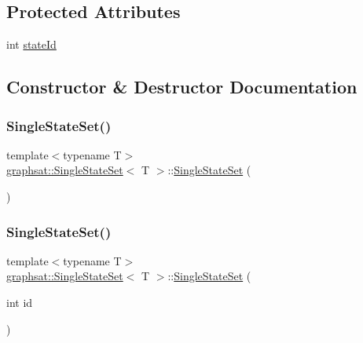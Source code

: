 \subsection*{Protected Attributes}
\begin{DoxyCompactItemize}
\item 
int \mbox{\hyperlink{classgraphsat_1_1_single_state_set_a9334c3f0f7db1854fcb6c2b111955901}{state\+Id}}
\end{DoxyCompactItemize}


\subsection{Constructor \& Destructor Documentation}
\mbox{\label{classgraphsat_1_1_single_state_set_ac6cb2aab41361938e53ea2125c7bc9fa}} 
\subsubsection{\texorpdfstring{SingleStateSet()}{SingleStateSet()}\hspace{0.1cm}{\footnotesize\ttfamily [1/2]}}
{\footnotesize\ttfamily template$<$typename T$>$ \\
\mbox{\hyperlink{classgraphsat_1_1_single_state_set}{graphsat\+::\+Single\+State\+Set}}$<$ T $>$\+::\mbox{\hyperlink{classgraphsat_1_1_single_state_set}{Single\+State\+Set}} (\begin{DoxyParamCaption}{ }\end{DoxyParamCaption})\hspace{0.3cm}{\ttfamily [inline]}}

\mbox{\label{classgraphsat_1_1_single_state_set_a0f3b02207b01343d16165273fd3810d3}} 
\subsubsection{\texorpdfstring{SingleStateSet()}{SingleStateSet()}\hspace{0.1cm}{\footnotesize\ttfamily [2/2]}}
{\footnotesize\ttfamily template$<$typename T$>$ \\
\mbox{\hyperlink{classgraphsat_1_1_single_state_set}{graphsat\+::\+Single\+State\+Set}}$<$ T $>$\+::\mbox{\hyperlink{classgraphsat_1_1_single_state_set}{Single\+State\+Set}} (\begin{DoxyParamCaption}\item[{int}]{id }\end{DoxyParamCaption})\hspace{0.3cm}{\ttfamily [inline]}}



